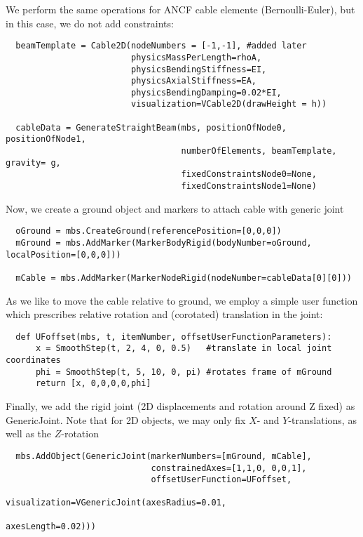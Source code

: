 \noindent We perform the same operations for ANCF cable elemente (Bernoulli-Euler),
but in this case, we do not add constraints:
\pythonstyle\begin{lstlisting}
  beamTemplate = Cable2D(nodeNumbers = [-1,-1], #added later
                         physicsMassPerLength=rhoA,
                         physicsBendingStiffness=EI,
                         physicsAxialStiffness=EA,
                         physicsBendingDamping=0.02*EI,
                         visualization=VCable2D(drawHeight = h))

  cableData = GenerateStraightBeam(mbs, positionOfNode0, positionOfNode1, 
                                   numberOfElements, beamTemplate, gravity= g, 
                                   fixedConstraintsNode0=None, 
                                   fixedConstraintsNode1=None)
\end{lstlisting}

\noindent Now, we create a ground object and markers to attach cable with generic joint
\pythonstyle\begin{lstlisting}
  oGround = mbs.CreateGround(referencePosition=[0,0,0])
  mGround = mbs.AddMarker(MarkerBodyRigid(bodyNumber=oGround, localPosition=[0,0,0]))

  mCable = mbs.AddMarker(MarkerNodeRigid(nodeNumber=cableData[0][0]))
\end{lstlisting}

\noindent As we like to move the cable relative to ground, we employ a simple 
user function which prescribes relative rotation and (corotated) translation in the joint:
\pythonstyle\begin{lstlisting}
  def UFoffset(mbs, t, itemNumber, offsetUserFunctionParameters):
      x = SmoothStep(t, 2, 4, 0, 0.5)   #translate in local joint coordinates
      phi = SmoothStep(t, 5, 10, 0, pi) #rotates frame of mGround
      return [x, 0,0,0,0,phi]

\end{lstlisting}

\noindent Finally, we add the rigid joint (2D displacements and rotation around Z fixed) as GenericJoint.
Note that for 2D objects, we may only fix $X$- and $Y$-translations, as well as the $Z$-rotation
\pythonstyle\begin{lstlisting}
  mbs.AddObject(GenericJoint(markerNumbers=[mGround, mCable],
                             constrainedAxes=[1,1,0, 0,0,1],
                             offsetUserFunction=UFoffset,
                             visualization=VGenericJoint(axesRadius=0.01,
                                                         axesLength=0.02)))
\end{lstlisting}

